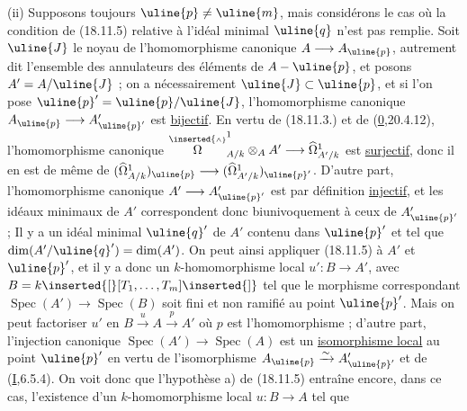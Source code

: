 (ii) Supposons toujours $\uline{p}\neq\uline{m}$, mais considérons le cas où la condition de (18.11.5) relative à  l'idéal minimal $\uline{q}$ n'est pas remplie. Soit $\uline{J}$ le noyau de l'homomorphisme canonique $A\longrightarrow A_{\uline{p}}$, autrement dit l'ensemble des annulateurs des éléments de $A-\uline{p}$, et posons $A'=A/\uline{J}$ ; on a nécessairement $\uline{J}\subset\uline{p}$, et si l'on pose $\uline{p}'=\uline{p}/\uline{J}$, l'homomorphisme canonique $A_{\uline{p}}\longrightarrow A'_{\uline{p}'}$ est \uline{bijectif}. En vertu de (18.11.3.) et de (\uline{0},20.4.12), l'homomorphisme canonique
$\overset{\inserted{\scriptscriptstyle\wedge}}{\Omega}^1_{A/k}\otimes_A A'\longrightarrow\widehat\Omega^1_{A'/k}$ est \uline{surjectif}, donc il en est de même de $(\widehat\Omega^1_{A/k})_{\uline{p}}\longrightarrow(\widehat\Omega^1_{A'/k})_{\uline{p}'}$. D'autre part, l'homomorphisme canonique $A'\longrightarrow A'_{\uline{p}'}$ est par définition \uline{injectif}, et les idéaux  minimaux de $A'$ correspondent donc biunivoquement à ceux de $A'_{\uline{p}'}$ ;  Il y a un idéal minimal $\uline{q}'$ de $A'$  contenu dans  $\uline{p}'$ et tel que $\dim(A'/\uline{q}')=\dim(A')$. On peut ainsi appliquer (18.11.5) à $A'$ et $\uline{p}'$, et il y a donc un $k$-homomorphisme local $u':B\longrightarrow A'$, avec $B=k\inserted{[}[T_1,\ldots,T_m]\inserted{]}$ tel que le morphisme correspondant $\operatorname{Spec}(A')\longrightarrow\operatorname{Spec}(B)$ soit fini et non ramifié au point $\uline{p}'$. Mais on peut factoriser $u'$ en $B\xrightarrow{u}A\xrightarrow{p}A'$ où  $p$ est l'homomorphisme  ; d'autre part, l'injection canonique $\operatorname{Spec}(A')\longrightarrow\operatorname{Spec}(A)$ est un  \uline{isomorphisme local} au point $\uline{p}'$ en vertu de l'isomorphisme $A_{\uline{p}}\xrightarrow{\sim}A'_{\uline{p}'}$ et de (\uline{I},6.5.4). On voit donc que l'hypothèse a) de (18.11.5) entraîne encore, dans ce cas, l'existence d'un $k$-homomorphisme local $u:B\longrightarrow A$ tel que

